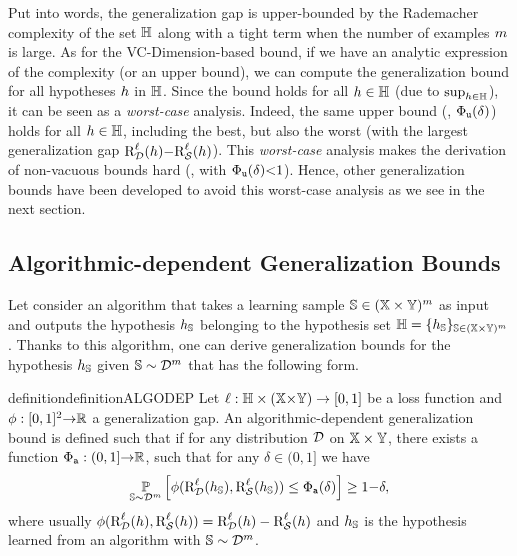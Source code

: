 Put into words, the generalization gap is upper-bounded by the Rademacher complexity of the set $\mathbb{H}$ along with a tight term when the number of examples $m$ is large.
As for the VC-Dimension-based bound, if we have an analytic expression of the complexity (or an upper bound), we can compute the generalization bound for all hypotheses $h$ in $\mathbb{H}$.
Since the bound holds for all $h\in\mathbb{H}$ (due to $\sup_{h\in\mathbb{H}}$), it can be seen as a {\it worst-case} analysis.
Indeed, the same upper bound (\ie, $\Phi_{{\tt u}}(\delta)$) holds for all $h\in\mathbb{H}$, including the best, but also the worst (with the largest generalization gap $\text{R}^{\ell}_{\mathcal{D}}(h){-}\text{R}^{\ell}_{\mathcal{S}}(h)$).
This {\it worst-case} analysis makes the derivation of non-vacuous bounds hard (\ie, with $\Phi_{{\tt u}}(\delta){<}1$).
Hence, other generalization bounds have been developed to avoid this worst-case analysis as we see in the next section. 

\subsection{Algorithmic-dependent Generalization Bounds}
\label{chap:intro:sec:bound-algo}

Let consider an algorithm that takes a learning sample $\mathbb{S}\in(\mathbb{X}\times\mathbb{Y})^m$ as input and outputs the hypothesis $h_{\mathbb{S}}$ belonging to the hypothesis set $\mathbb{H}=\{h_{\mathbb{S}}\}_{\mathbb{S}\in(\mathbb{X}{\times}\mathbb{Y})^m}$.
Thanks to this algorithm, one can derive generalization bounds for the hypothesis $h_{\mathbb{S}}$ given $\mathbb{S}\sim\mathcal{D}^m$ that has the following form.

\begin{restatable}{definition}{definitionALGODEP}\label{chap:intro:def:algo} Let $\ell: \mathbb{H} \times(\mathbb{X}{\times}\mathbb{Y})\rightarrow [0, 1]$ be a loss function and $\phi: [0,1]^2{\to}\mathbb{R}$ a generalization gap. 
An algorithmic-dependent generalization bound is defined such that if for any distribution $\mathcal{D}$ on $\mathbb{X}\times\mathbb{Y}$, there exists a function $\Phi_{{\tt a}}: (0,1]{\to} \mathbb{R}$, such that for any  $\delta\in(0, 1]$ we have
\begin{align}
    \operatorname*{\mathbb{P}}_{\mathbb{S}\sim\mathcal{D}^m}\Big[ \phi(\text{R}^{\ell}_{\mathcal{D}}(h_{\mathbb{S}}), \text{R}^{\ell}_{\mathcal{S}}(h_{\mathbb{S}})) \le \Phi_{{\tt a}}(\delta) \Big] \ge 1{-}\delta,\label{chap:intro:eq:algo}
\end{align}
where usually $\phi(\text{R}^{\ell}_{\mathcal{D}}(h), \text{R}^{\ell}_{\mathcal{S}}(h)) = \text{R}^{\ell}_{\mathcal{D}}(h) - \text{R}^{\ell}_{\mathcal{S}}(h)$ and $h_{\mathbb{S}}$ is the hypothesis learned from an algorithm with $\mathbb{S}\sim\mathcal{D}^m$.

\end{restatable}

